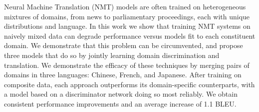 Neural Machine Translation (NMT) models are often trained on heterogeneous mixtures of domains, from news to parliamentary proceedings, each with unique distributions and language. In this work we show that training NMT systems on naively mixed data can degrade performance versus models fit to each constituent domain. We demonstrate that this problem can be circumvented, and propose three models that do so by jointly learning domain discrimination and translation. We demonstrate the efficacy of these techniques by merging pairs of domains in three languages: Chinese, French, and Japanese. After training on composite data, each approach outperforms its domain-specific counterparts, with a model based on a discriminator network doing so most reliably. We obtain consistent performance improvements and an average increase of 1.1 BLEU.
